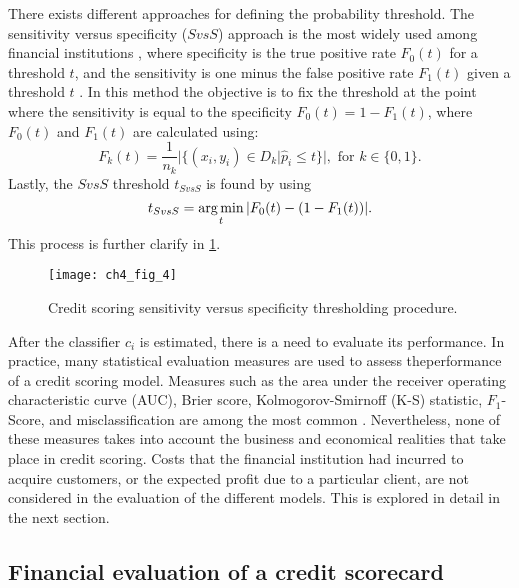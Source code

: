   There exists different approaches for defining the probability threshold. The sensitivity versus 
  specificity ($SvsS$) approach is the most widely used among financial institutions 
  \citep{Anderson2007}, where specificity is the true positive rate $F_0(t)$ for a threshold $t$, 
  and the sensitivity is one minus the false positive rate $F_1(t)$ given a threshold $t$ 
  \citep{Hernandez-Orallo2012}. In this method the objective is to fix the threshold at the point 
  where the sensitivity is equal to the specificity $F_0(t)=1-F_1(t)$, where $F_0(t)$ and $F_1(t)$ 
  are calculated using:
  \begin{equation}
   F_k(t)=\frac{1}{n_k}\vert \{ ( x_i,y_i ) \in D_k \vert \hat p_i \le t \}\vert, \text{ for } 
   k\in\{0,1\}.
  \end{equation}
  Lastly, the $SvsS$ threshold $t_{SvsS}$ is found by using
  \begin{equation}
  t_{SvsS}= \operatorname*{arg\,min}_t \vert F_0(t) - (1-F_1(t)) \vert.
  \end{equation}
  This process is further clarify in \figurename{ \ref{fig:ch4:4}}.
  
  \begin{figure}
  \centering
  \centering
  \texttt{[image: ch4\_fig\_4]}
  \caption{Credit scoring sensitivity versus specificity thresholding procedure.}
  \label{fig:ch4:4}
  \end{figure}
  
  After the classifier $c_i$ is estimated, there is a need to evaluate its performance. In 
  practice, many statistical evaluation measures are used to assess theperformance of a credit 
  scoring model. Measures such as the area under the  receiver operating characteristic curve (AUC),
  Brier score, Kolmogorov-Smirnoff (K-S) statistic,  $F_1$-Score, and misclassification are among 
  the most common \citep{Beling2005}. Nevertheless, none of these measures takes into account the 
  business and economical realities that take place in credit scoring. Costs that the financial 
  institution had incurred to acquire customers, or the expected profit due to a particular client, 
  are not considered in the evaluation of the different models. This is explored in detail in the 
  next section.

  
  \subsection{Financial evaluation of a credit scorecard }
  
